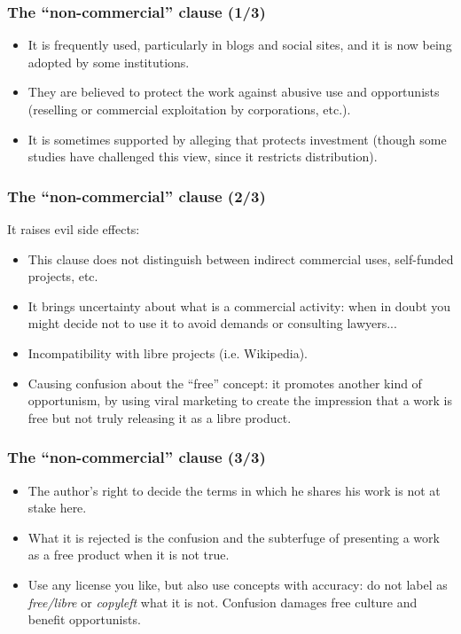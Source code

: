 \documentclass{beamer}
\begin{document}

\begin{frame}
\frametitle{The ``non-commercial'' clause (1/3)}

\begin{itemize}
\item It is frequently used, particularly in blogs and social sites, and it is now being adopted by some institutions.
\item They are believed to protect the work against abusive use and opportunists (reselling or commercial exploitation by corporations, etc.).
\item It is sometimes supported by alleging that protects investment (though some studies have challenged this view, since it restricts distribution).
\end{itemize}                                                 

\end{frame}


\begin{frame}
\frametitle{The ``non-commercial'' clause (2/3)}

It raises evil side effects: 
\begin{itemize}
\item This clause does not distinguish between indirect commercial uses, self-funded projects, etc.
\item It brings uncertainty about what is a commercial activity: when in doubt you might decide not to use it to avoid demands or consulting lawyers... 
\item Incompatibility with libre projects (i.e. Wikipedia).
\item Causing confusion about  the ``free'' concept: it promotes another kind of opportunism, by using viral marketing to create the impression that a work is free but not truly releasing it as a libre product.
\end{itemize}                                                 

\end{frame}


\begin{frame}
\frametitle{The ``non-commercial'' clause (3/3)}

\begin{itemize}
\item The author's right to decide the terms in which he shares his work is not at stake here.
\item What it is rejected is the confusion and the subterfuge of presenting a work as a free product when it is not true.
\item Use any license you like, but also use concepts with accuracy: do not label as \textit{free/libre} or \textit{copyleft} what it is not. Confusion damages free culture and benefit opportunists.
\end{itemize}
\end{frame}
\end{document}
